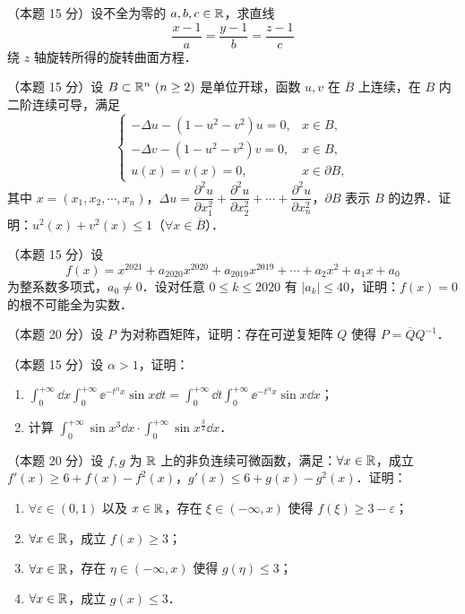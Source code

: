 
\begin{problems}

\item[一、]（本题 15 分）设不全为零的 $a,b,c\in\mathbb{R}$，求直线
\[
  \frac{x-1}{a}=\frac{y-1}{b}=\frac{z-1}{c}
\]
绕 $z$ 轴旋转所得的旋转曲面方程．

\item[二、]（本题 15 分）设 $B\subset\mathbb{R}^n\ (n\ge 2)$ 是单位开球，函数 $u,v$ 在 $\overline{B}$ 上连续，在 $B$ 内二阶连续可导，满足
\[
  \begin{cases}
    -\Delta u-(1-u^2-v^2)u=0, & x\in B,\\
    -\Delta v-(1-u^2-v^2)v=0, & x\in B,\\
    u(x)=v(x)=0, & x\in\partial B,
  \end{cases}
\]
其中 $x=(x_1,x_2,\cdots,x_n)$，$\Delta u=\dfrac{\partial^2u}{\partial x_1^2}+\dfrac{\partial^2u}{\partial x_2^2}+\cdots+\dfrac{\partial^2u}{\partial x_n^2}$，$\partial B$ 表示 $B$ 的边界．证明：$u^2(x)+v^2(x)\le 1$（$\forall x\in\overline{B}$）．

\item[三、]（本题 15 分）设
\[
  f(x)=x^{2021}+a_{2020}x^{2020}+a_{2019}x^{2019}+\cdots+a_2x^2+a_1x+a_0
\]
为整系数多项式，$a_0\ne 0$．设对任意 $0\le k\le 2020$ 有 $|a_k|\le 40$，证明：$f(x)=0$ 的根不可能全为实数．

\item[四、]（本题 20 分）设 $P$ 为对称酉矩阵，证明：存在可逆复矩阵 $Q$ 使得 $P=\overline{Q}Q^{-1}$．

\item[五、]（本题 15 分）设 $\alpha>1$，证明：
\begin{enumerate}[label=(\arabic*)]
  \item $\displaystyle\int_0^{+\infty}\dd x\int_0^{+\infty}\ee^{-t^\alpha x}\sin x\dd t=\int_0^{+\infty}\dd t\int_0^{+\infty}\ee^{-t^\alpha x}\sin x\dd x$；
  \item 计算 $\displaystyle\int_0^{+\infty}\sin x^3\dd x\cdot\int_0^{+\infty}\sin x^{\frac{3}{2}}\dd x$．
\end{enumerate}

\item[六、]（本题 20 分）设 $f,g$ 为 $\mathbb{R}$ 上的非负连续可微函数，满足：$\forall x\in\mathbb{R}$，成立 $f'(x)\ge 6+f(x)-f^2(x)$，$g'(x)\le 6+g(x)-g^2(x)$．证明：
\begin{enumerate}[label=(\arabic*)]
  \item $\forall\varepsilon\in(0,1)$ 以及 $x\in\mathbb{R}$，存在 $\xi\in(-\infty,x)$ 使得 $f(\xi)\ge 3-\varepsilon$；
  \item $\forall x\in\mathbb{R}$，成立 $f(x)\ge 3$；
  \item $\forall x\in\mathbb{R}$，存在 $\eta\in(-\infty,x)$ 使得 $g(\eta)\le 3$；
  \item $\forall x\in\mathbb{R}$，成立 $g(x)\le 3$．
\end{enumerate}

\end{problems}
